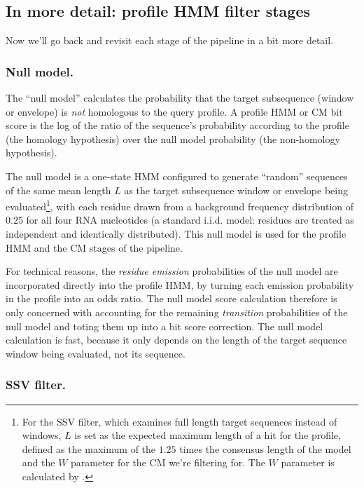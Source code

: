 \subsection{In more detail: profile HMM filter stages}

Now we'll go back and revisit each stage of the pipeline in a bit more detail.

\subsubsection{Null model.}

The ``null model'' calculates the probability that the target
subsequence (window or envelope) is \emph{not} homologous to the query
profile. A profile HMM or CM bit score is the log of the ratio of the
sequence's probability according to the profile (the homology
hypothesis) over the null model probability (the non-homology
hypothesis).

The null model is a one-state HMM configured to generate ``random''
sequences of the same mean length $L$ as the target subsequence window
or envelope being evaluated\footnote{For the SSV filter, which
examines full length target sequences instead of windows, $L$ is set
as the expected maximum length of a hit for the profile, defined as
the maximum of the $1.25$ times the consensus length of the model and
the $W$ parameter for the CM we're filtering for. The $W$ parameter is
calculated by .}, with each residue drawn from a
background frequency distribution of $0.25$ for all four RNA
nucleotides (a standard i.i.d. model: residues are treated as
independent and identically distributed). This null model is used for
the profile HMM and the CM stages of the pipeline.

For technical reasons, the \emph{residue emission} probabilities of
the null model are incorporated directly into the profile HMM, by
turning each emission probability in the profile into an odds
ratio. The null model score calculation therefore is only concerned
with accounting for the remaining \emph{transition} probabilities of
the null model and toting them up into a bit score correction.  The
null model calculation is fast, because it only depends on the length
of the target sequence window being evaluated, not its sequence.

\subsubsection{SSV filter.}

